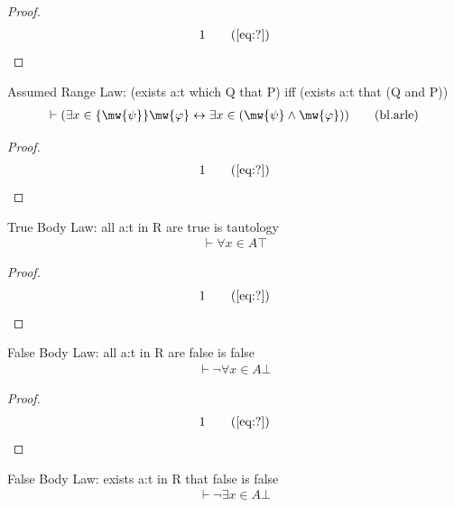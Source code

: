 \begin{proof}
\begin{align}
  1 &&  & &(\mbox{\ref{eq:?}})\notag
\end{align}
\end{proof}

\begin{lemma} Assumed Range Law: (exists a:t which Q that
P) iff (exists a:t that (Q and P))
\begin{align}
\vdash ( \exists x \in \{ \mw{\psi} \} \mw{\varphi} \leftrightarrow \exists x
    \in ( \mw{\psi} \wedge \mw{\varphi} ) )\label{eq:bl.arle}\tag{bl.arle}
\end{align}
\end{lemma}

\begin{proof}
\begin{align}
  1 &&  & &(\mbox{\ref{eq:?}})\notag
\end{align}
\end{proof}

\begin{lemma} True Body Law: all a:t in R are true is
tautology
\begin{align}
\vdash \forall x \in A \top\label{eq:bl.tbla}\tag{bl.tbla}
\end{align}
\end{lemma}

\begin{proof}
\begin{align}
  1 &&  & &(\mbox{\ref{eq:?}})\notag
\end{align}
\end{proof}

\begin{lemma} False Body Law:  all a:t in R are false is
false
\begin{align}
\vdash \lnot \forall x \in A \bot\label{eq:bl.fbla}\tag{bl.fbla}
\end{align}
\end{lemma}

\begin{proof}
\begin{align}
  1 &&  & &(\mbox{\ref{eq:?}})\notag
\end{align}
\end{proof}

\begin{lemma} False Body Law:  exists a:t in R that false
is false
\begin{align}
\vdash \lnot \exists x \in A \bot\label{eq:bl.fble}\tag{bl.fble}
\end{align}
\end{lemma}

